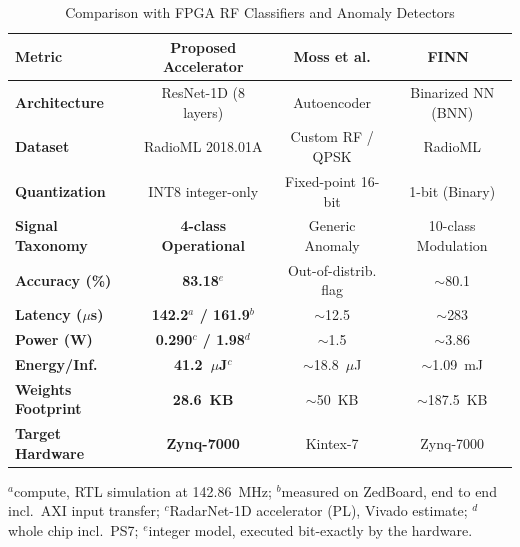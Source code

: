 \documentclass[conference]{IEEEtran}
\begin{document}
\begin{table}[t]
\renewcommand{\arraystretch}{1.15}
\caption{Comparison with FPGA RF Classifiers and Anomaly Detectors}
\label{tab:comparison}
\centering
\scriptsize
\setlength{\tabcolsep}{1.2pt}
\begin{tabular}{lccc}
\toprule
\textbf{Metric} & \textbf{Proposed Accelerator} & \textbf{Moss et al. \cite{b10}} & \textbf{FINN~\cite{b14}} \\
\midrule
\textbf{Architecture}   & ResNet-1D (8 layers)    & Autoencoder & Binarized NN (BNN) \\
\textbf{Dataset}        & RadioML 2018.01A        & Custom RF / QPSK      & RadioML \\
\textbf{Quantization}   & INT8 integer-only & Fixed-point 16-bit    & 1-bit (Binary) \\
\textbf{Signal Taxonomy}& \textbf{4-class Operational} & Generic Anomaly  & 10-class Modulation \\
\textbf{Accuracy (\%)}  & \textbf{83.18$^{e}$} & Out-of-distrib. flag & $\sim$80.1 \\
\textbf{Latency ($\mu$s)} & \textbf{142.2$^{a}$ / 161.9$^{b}$} & $\sim$12.5          & $\sim$283 \\
\textbf{Power (W)}      & \textbf{0.290$^{c}$ / 1.98$^{d}$} & $\sim$1.5 & $\sim$3.86 \\
\textbf{Energy/Inf.}    & \textbf{41.2~$\mu$J$^{c}$}    & $\sim$18.8~$\mu$J     & $\sim$1.09~mJ \\
\textbf{Weights Footprint} & \textbf{28.6~KB}     & $\sim$50~KB           & $\sim$187.5~KB \\
\textbf{Target Hardware}& \textbf{Zynq-7000} & Kintex-7 & {Zynq-7000} \\
\bottomrule
\end{tabular}

\vspace{2pt}
\parbox{\columnwidth}{\scriptsize $^{a}$compute, RTL simulation at 142.86~MHz; $^{b}$measured on ZedBoard, end to end incl.\ AXI input transfer; $^{c}$RadarNet-1D accelerator (PL), Vivado estimate; $^{d}$whole chip incl.\ PS7; $^{e}$integer model, executed bit-exactly by the hardware.}
\end{table}
\end{document}
